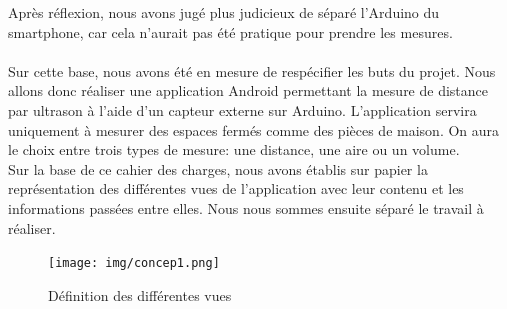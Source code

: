 Après réflexion, nous avons jugé plus judicieux de séparé l'Arduino du smartphone, car cela n'aurait pas été pratique pour prendre les mesures.\\\\
Sur cette base, nous avons été en mesure de respécifier les buts du projet. Nous allons donc réaliser une application Android permettant la mesure de distance par ultrason à l'aide d'un capteur externe sur Arduino. L'application servira uniquement à mesurer des espaces fermés comme des pièces de maison. On aura le choix entre trois types de mesure: une distance, une aire ou un volume.\\
Sur la base de ce cahier des charges, nous avons établis sur papier la représentation des différentes vues de l'application avec leur contenu et les informations passées entre elles. Nous nous sommes ensuite séparé le travail à réaliser.
\begin{figure}[H]
	\begin{center}
		\texttt{[image: img/concep1.png]}
		\caption{Définition des différentes vues}
		\label{conception1}
	\end{center}
\end{figure}
